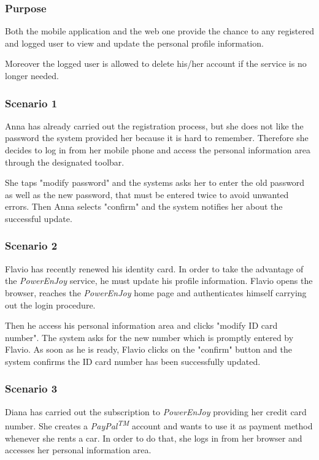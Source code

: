 \subsubsection{Purpose}
Both the mobile application and the web one provide the chance to any registered and logged user to view and update the personal profile information.

Moreover the logged user is allowed to delete his/her account if the service is no longer needed.

\subsubsection{Scenario 1}
Anna has already carried out the registration process, but she does not like the password the system provided her because it is hard to remember. Therefore she decides to log in from her mobile phone and access the personal information area through the designated toolbar.

She taps "modify password" and the systems asks her to enter the old password as well as the new password, that must be entered twice to avoid unwanted errors. Then Anna selects "confirm" and the system notifies her about the successful update.

\subsubsection{Scenario 2}
Flavio has recently renewed his identity card. In order to take the advantage of the \emph{PowerEnJoy} service, he must update his profile information. Flavio opens the browser, reaches the \emph{PowerEnJoy} home page and authenticates himself carrying out the login procedure. 

Then he access his personal information area and clicks "modify ID card number". The system asks for the new number which is promptly entered by Flavio. As soon as he is ready, Flavio clicks on the "confirm" button and the system confirms the ID card number has been successfully updated.

\subsubsection{Scenario 3}
Diana has carried out the subscription to \emph{PowerEnJoy} providing her credit card number. She creates a \emph{PayPal\textsuperscript{TM}} account and wants to use it as payment method whenever she rents a car. In order to do that, she logs in from her browser and accesses her personal information area.

